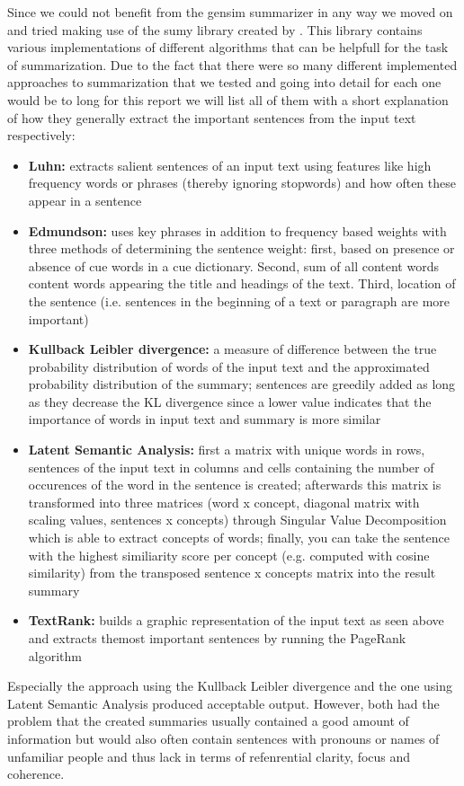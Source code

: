 Since we could not benefit from the gensim summarizer in any way we moved on and tried making use of the sumy library created by \citet{sumy}. This library contains various implementations of different algorithms that can be helpfull for the task of summarization. Due to the fact that there were so many different implemented approaches to summarization that we tested and going into detail for each one would be to long for this report we will list all of them with a short explanation of how they generally extract the important sentences from the input text respectively: 
\begin{itemize}
	\item \textbf{Luhn:} extracts salient sentences of an input text using features like high frequency words or phrases (thereby ignoring stopwords) and how often these appear in a sentence
	\item \textbf{Edmundson:} uses key phrases in addition to frequency based weights with three methods of determining the sentence weight: first, based on presence or absence of cue words in a cue dictionary. Second, sum of all content words content words appearing the title and headings of the text. Third, location of the sentence (i.e. sentences in the beginning of a text or paragraph are more important)
	\item \textbf{Kullback Leibler divergence:} a measure of difference between the true probability distribution of words of the input text and the approximated probability distribution of the summary; sentences are greedily added as long as they decrease the KL divergence since a lower value indicates that the importance of words in input text and summary is more similar
	\item \textbf{Latent Semantic Analysis:} first a matrix with unique words in rows, sentences of the input text in columns and cells containing the number of occurences of the word in the sentence is created; afterwards this matrix is transformed into  three matrices (word x concept, diagonal matrix with scaling values, sentences x concepts) through Singular Value Decomposition which is able to extract concepts of words; finally, you can take the sentence with the highest similiarity score per concept (e.g. computed with cosine similarity) from the transposed sentence x concepts matrix into the result summary 
	\item \textbf{TextRank:} builds a graphic representation of the input text as seen above and extracts themost important sentences by running the PageRank algorithm	
\end{itemize} 
Especially the approach using the Kullback Leibler divergence and the one using Latent Semantic Analysis produced acceptable output. However, both had the problem that the created summaries usually contained a good amount of information but would also often contain sentences with pronouns or names of unfamiliar people and thus lack in terms of refenrential clarity, focus and coherence. 

